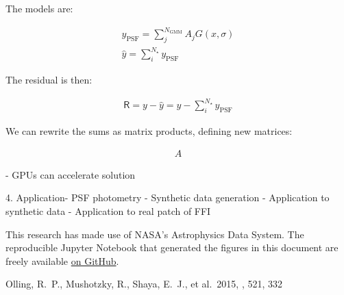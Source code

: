 \documentclass{rnaastex}
\newcommand{\vR}{\mathsf{R}}
\begin{document}
The models are:

\begin{eqnarray}
y_{\mathrm{PSF}} = \sum_j^{N_{\mathrm{GMM}}} A_j G(x, \sigma) \\
\hat y = \sum_i^{N_\star} y_{\mathrm{PSF}}
\end{eqnarray}

The residual is then:

\begin{eqnarray}
\vR = y - \hat y = y - \sum_i^{N_\star} y_{\mathrm{PSF}}
\end{eqnarray}

We can rewrite the sums as matrix products, defining new matrices:

\begin{eqnarray}
A
\end{eqnarray}

-  GPUs can accelerate solution

4. Application- PSF photometry
  - Synthetic data generation
  - Application to synthetic data
  - Application to real patch of FFI





\acknowledgments

This research has made use of NASA's Astrophysics Data System.  The reproducible Jupyter Notebook that generated the figures in this document are freely available \href{https://github.com/gully/quigly}{on GitHub}.

\begin{thebibliography}{}

 Olling, R.~P., Mushotzky, R., Shaya, E.~J., et al.\ 2015, \nat, 521, 332

\end{thebibliography}
\end{document}
